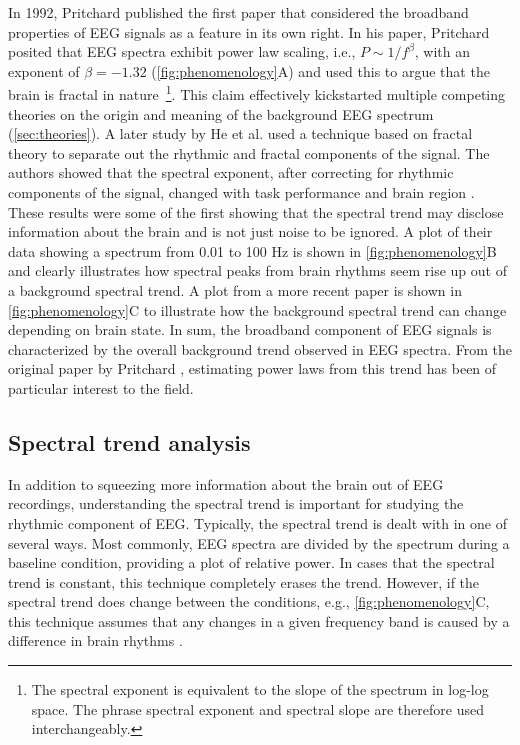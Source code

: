 In 1992, Pritchard \cite{Pritchard1992} published the first paper that considered the broadband properties of EEG signals as a feature in its own right. In his paper, Pritchard posited that EEG spectra exhibit power law scaling, i.e., $P\sim1/f^\beta$, with an exponent of $\beta=-1.32$ (\autoref{fig:phenomenology}A) and used this to argue that the brain is fractal in nature~\footnote[2]{The spectral exponent is equivalent to the slope of the spectrum in log-log space. The phrase spectral exponent and spectral slope are therefore used interchangeably.}. This claim effectively kickstarted multiple competing theories on the origin and meaning of the background EEG spectrum (\autoref{sec:theories}). A later study by He et al.\cite{He2010} used a technique based on fractal theory to separate out the rhythmic and fractal components of the signal. The authors showed that the spectral exponent, after correcting for rhythmic components of the signal, changed with task performance and brain region \cite{He2010}. These results were some of the first showing that the spectral trend may disclose information about the brain and is not just noise to be ignored. A plot of their data showing a spectrum from 0.01 to 100 \unit{\hertz} is shown in \autoref{fig:phenomenology}B and clearly illustrates how spectral peaks from brain rhythms seem rise up out of a background spectral trend. A plot from a more recent paper \cite{Colombo2019} is shown in \autoref{fig:phenomenology}C to illustrate how the background spectral trend can change depending on brain state. In sum, the broadband component of EEG signals is characterized by the overall background trend observed in EEG spectra. From the original paper by Pritchard \cite{Pritchard1992}, estimating power laws from this trend has been of particular interest to the field.

\subsection{Spectral trend analysis}
In addition to squeezing more information about the brain out of EEG recordings, understanding the spectral trend is important for studying the rhythmic component of EEG. Typically, the spectral trend is dealt with in one of several ways. Most commonly, EEG spectra are divided by the spectrum during a baseline condition, providing a plot of relative power. In cases that the spectral trend is constant, this technique completely erases the trend. However, if the spectral trend does change between the conditions, e.g., \autoref{fig:phenomenology}C, this technique assumes that any changes in a given frequency band is caused by a difference in brain rhythms \cite{Gerster2022}.

